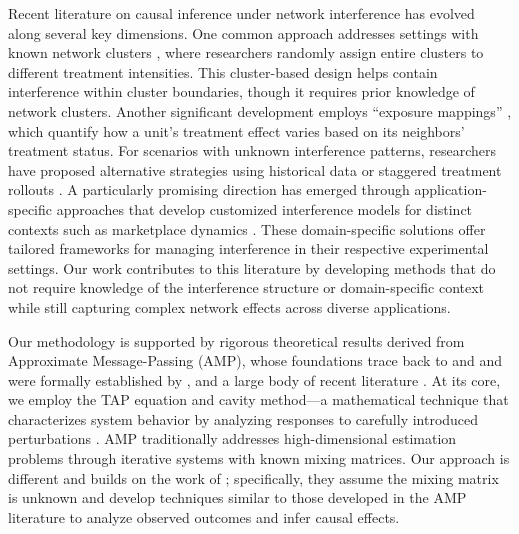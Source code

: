 Recent literature on causal inference under network interference has evolved along several key dimensions. One common approach addresses settings with known network clusters \citep{sobel2006randomized,rosenbaum2007interference,hudgens2008toward,tchetgen2012causal,auerbach2021local}, where researchers randomly assign entire clusters to different treatment intensities. This cluster-based design helps contain interference within cluster boundaries, though it requires prior knowledge of network clusters. Another significant development employs ``exposure mappings'' \citep{manski2013identification,aronow2017estimating,leung2022causal,harshaw2023design,savje2024causal}, which quantify how a unit's treatment effect varies based on its neighbors' treatment status. For scenarios with unknown interference patterns, researchers have proposed alternative strategies using historical data or staggered treatment rollouts \citep{yu2022estimating,cortez2022staggered}. A particularly promising direction has emerged through application-specific approaches that develop customized interference models for distinct contexts such as marketplace dynamics \citep{bajari2021multiple,holtz2020reducing,wager2021experimenting,munro2021treatment,johari2022experimental,bright2022reducing}. These domain-specific solutions offer tailored frameworks for managing interference in their respective experimental settings. Our work contributes to this literature by developing methods that do not require knowledge of the interference structure or domain-specific context while still capturing complex network effects across diverse applications.

Our methodology is supported by rigorous theoretical results derived from Approximate Message-Passing (AMP), whose foundations trace back to  \cite{thouless1977solution,kabashima2003cdma} and \cite{donoho2009message} and were formally established by \cite{bolthausen2014iterative}, \cite{bayati2011dynamics} and a large body of recent literature \citep{javanmard2013state,bayati2015universality,berthier2020state,chen2020universality,xinyi2021approximate,wang2022universality,dudeja2023universality,rush2018finite,li2022non}. At its core, we employ the TAP equation and cavity method—a mathematical technique that characterizes system behavior by analyzing responses to carefully introduced perturbations \citep{mezard1986spin,mezard2009information}. AMP traditionally addresses high-dimensional estimation problems through iterative systems with known mixing matrices. Our approach is different and builds on the work of \cite{shirani2024causal}; specifically, they assume the mixing matrix is unknown and develop techniques similar to those developed in the AMP literature to analyze observed outcomes and infer causal effects.

